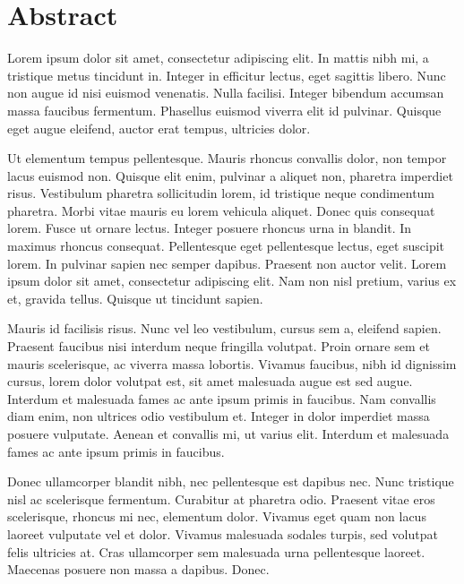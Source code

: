 \documentclass[../eva1_scion.tex]{subfiles}
\begin{document}
\chapter*{Abstract}

Lorem ipsum dolor sit amet, consectetur adipiscing elit. In mattis nibh mi, a tristique metus tincidunt in. Integer in efficitur lectus, eget sagittis libero. Nunc non augue id nisi euismod venenatis. Nulla facilisi. Integer bibendum accumsan massa faucibus fermentum. Phasellus euismod viverra elit id pulvinar. Quisque eget augue eleifend, auctor erat tempus, ultricies dolor.

Ut elementum tempus pellentesque. Mauris rhoncus convallis dolor, non tempor lacus euismod non. Quisque elit enim, pulvinar a aliquet non, pharetra imperdiet risus. Vestibulum pharetra sollicitudin lorem, id tristique neque condimentum pharetra. Morbi vitae mauris eu lorem vehicula aliquet. Donec quis consequat lorem. Fusce ut ornare lectus. Integer posuere rhoncus urna in blandit. In maximus rhoncus consequat. Pellentesque eget pellentesque lectus, eget suscipit lorem. In pulvinar sapien nec semper dapibus. Praesent non auctor velit. Lorem ipsum dolor sit amet, consectetur adipiscing elit. Nam non nisl pretium, varius ex et, gravida tellus. Quisque ut tincidunt sapien.

Mauris id facilisis risus. Nunc vel leo vestibulum, cursus sem a, eleifend sapien. Praesent faucibus nisi interdum neque fringilla volutpat. Proin ornare sem et mauris scelerisque, ac viverra massa lobortis. Vivamus faucibus, nibh id dignissim cursus, lorem dolor volutpat est, sit amet malesuada augue est sed augue. Interdum et malesuada fames ac ante ipsum primis in faucibus. Nam convallis diam enim, non ultrices odio vestibulum et. Integer in dolor imperdiet massa posuere vulputate. Aenean et convallis mi, ut varius elit. Interdum et malesuada fames ac ante ipsum primis in faucibus.

Donec ullamcorper blandit nibh, nec pellentesque est dapibus nec. Nunc tristique nisl ac scelerisque fermentum. Curabitur at pharetra odio. Praesent vitae eros scelerisque, rhoncus mi nec, elementum dolor. Vivamus eget quam non lacus laoreet vulputate vel et dolor. Vivamus malesuada sodales turpis, sed volutpat felis ultricies at. Cras ullamcorper sem malesuada urna pellentesque laoreet. Maecenas posuere non massa a dapibus. Donec.
\end{document}

